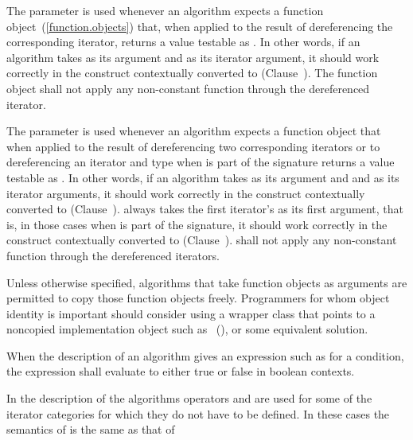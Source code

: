 \begin{removedblock}
\pnum
The
parameter is used whenever an algorithm expects a function object~(\ref{function.objects})
that, when applied to the result
of dereferencing the corresponding iterator, returns a value testable as
.
In other words, if an algorithm
takes
as its argument and 
as its iterator argument, it should work correctly in the
construct
 contextually converted to  (Clause~).
The function object
shall not apply any non-constant
function through the dereferenced iterator.

\pnum
The
parameter is used whenever an algorithm expects a function object that when applied to
the result of dereferencing two corresponding iterators or to dereferencing an
iterator and type
when
is part of the signature returns a value testable as
.
In other words, if an algorithm takes
as its argument and  and  as
its iterator arguments, it should work correctly in
the construct
 contextually converted to  (Clause~).
always takes the first
iterator's 
as its first argument, that is, in those cases when
is part of the signature, it should work
correctly in the
construct  contextually converted to  (Clause~).
 shall not
apply any non-constant function through the dereferenced iterators.
\end{removedblock}

\pnum
\enternote
Unless otherwise specified, algorithms that take function objects as arguments
are permitted to copy those function objects freely. Programmers for whom object
identity is important should consider using a wrapper class that points to a
noncopied implementation object such as ~(), or some equivalent solution.
\exitnote

\begin{removedblock}
\pnum
When the description of an algorithm gives an expression such as
for a condition, the expression shall evaluate to
either true or false in boolean contexts.
\end{removedblock}

\pnum
In the description of the algorithms operators
\tcode{+}
and
\tcode{-}
are used for some of the iterator categories for which
they do not have to be defined.
In these cases the semantics of
is the same as that of

